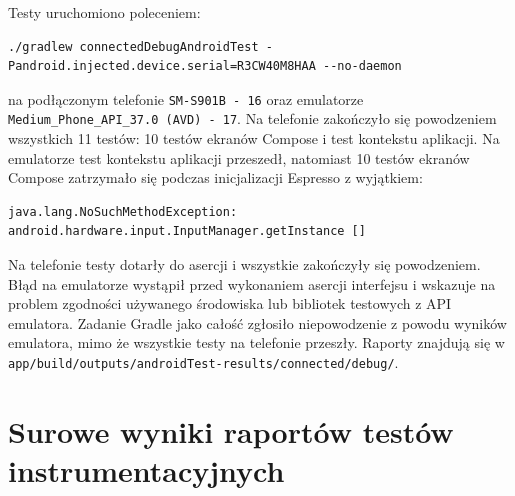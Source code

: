 \documentclass[a4paper,12pt]{article}
\begin{document}
Testy uruchomiono poleceniem:
\begin{verbatim}
./gradlew connectedDebugAndroidTest -Pandroid.injected.device.serial=R3CW40M8HAA --no-daemon
\end{verbatim}
na podłączonym telefonie \texttt{SM-S901B - 16} oraz emulatorze \texttt{Medium\_Phone\_API\_37.0 (AVD) - 17}. Na telefonie zakończyło się powodzeniem wszystkich 11 testów: 10 testów ekranów Compose i test kontekstu aplikacji. Na emulatorze test kontekstu aplikacji przeszedł, natomiast 10 testów ekranów Compose zatrzymało się podczas inicjalizacji Espresso z wyjątkiem:
\begin{verbatim}
java.lang.NoSuchMethodException:
android.hardware.input.InputManager.getInstance []
\end{verbatim}
Na telefonie testy dotarły do asercji i wszystkie zakończyły się powodzeniem. Błąd na emulatorze wystąpił przed wykonaniem asercji interfejsu i wskazuje na problem zgodności używanego środowiska lub bibliotek testowych z API emulatora. Zadanie Gradle jako całość zgłosiło niepowodzenie z powodu wyników emulatora, mimo że wszystkie testy na telefonie przeszły. Raporty znajdują się w \texttt{app/build/outputs/androidTest-results/connected/debug/}.

\section{Surowe wyniki raportów testów instrumentacyjnych}
\end{document}
